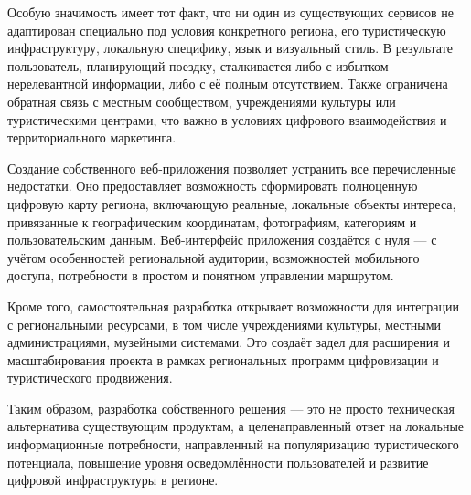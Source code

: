 Особую значимость имеет тот факт, что ни один из существующих сервисов не адаптирован специально под условия конкретного региона, его туристическую инфраструктуру, локальную специфику, язык и визуальный стиль. В результате пользователь, планирующий поездку, сталкивается либо с избытком нерелевантной информации, либо с её полным отсутствием. Также ограничена обратная связь с местным сообществом, учреждениями культуры или туристическими центрами, что важно в условиях цифрового взаимодействия и территориального маркетинга.

Создание собственного веб-приложения позволяет устранить все перечисленные недостатки. Оно предоставляет возможность сформировать полноценную цифровую карту региона, включающую реальные, локальные объекты интереса, привязанные к географическим координатам, фотографиям, категориям и пользовательским данным. Веб-интерфейс приложения создаётся с нуля — с учётом особенностей региональной аудитории, возможностей мобильного доступа, потребности в простом и понятном управлении маршрутом.

Кроме того, самостоятельная разработка открывает возможности для интеграции с региональными ресурсами, в том числе учреждениями культуры, местными администрациями, музейными системами. Это создаёт задел для расширения и масштабирования проекта в рамках региональных программ цифровизации и туристического продвижения.

Таким образом, разработка собственного решения — это не просто техническая альтернатива существующим продуктам, а целенаправленный ответ на локальные информационные потребности, направленный на популяризацию туристического потенциала, повышение уровня осведомлённости пользователей и развитие цифровой инфраструктуры в регионе.



